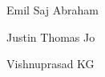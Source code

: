 {\begin{flushright}
    Emil Saj Abraham
    
    Justin Thomas Jo
    
    Vishnuprasad KG
\end{flushright}





    
}
